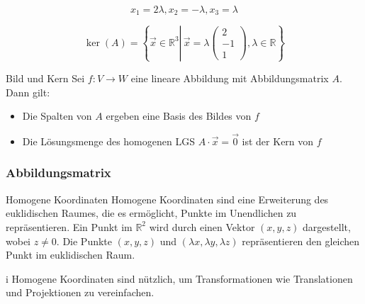 \begin{example}

    $$
    x_{1}=2 \lambda, x_{2}=-\lambda, x_{3}=\lambda
    $$

    $$
    \operatorname{ker}(A)=\left\{\vec{x} \in \mathbb{R}^{3} \left\lvert\, \vec{x}=\lambda\left(\begin{array}{c}
    2 \\
    -1 \\
    1
    \end{array}\right)\right., \lambda \in \mathbb{R}\right\}
    $$
\end{example}

\begin{theorem}{Bild und Kern}
    Sei $f: V \rightarrow W$ eine lineare Abbildung mit Abbildungsmatrix $A$. Dann gilt:
    \begin{itemize}
        \item Die Spalten von $A$ ergeben eine Basis des Bildes von $f$
        \item Die Lösungsmenge des homogenen LGS $A \cdot \vec{x} = \overrightarrow{0}$ ist der Kern von $f$
    \end{itemize}
\end{theorem}

\columnbreak

\subsubsection*{Abbildungsmatrix}

\begin{definition}{Homogene Koordinaten}
    Homogene Koordinaten sind eine Erweiterung des euklidischen Raumes, die es ermöglicht, Punkte im Unendlichen zu repräsentieren.
    Ein Punkt im $\mathbb{R}^2$ wird durch einen Vektor $(x, y, z)$ dargestellt, wobei $z\neq 0$.
    Die Punkte $(x, y, z)$ und $(\lambda x, \lambda y, \lambda z)$ repräsentieren den gleichen Punkt im euklidischen Raum.
    \begin{highlight}{i}
        Homogene Koordinaten sind nützlich, um Transformationen wie Translationen und Projektionen zu vereinfachen.
    \end{highlight}
    
\end{definition}

